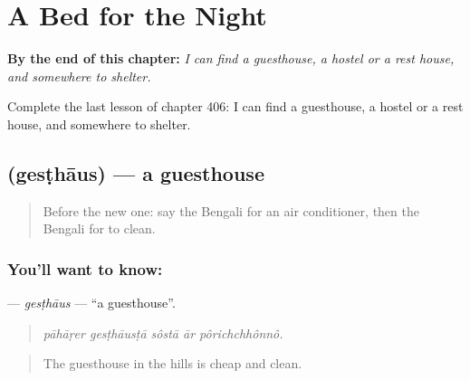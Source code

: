 
\chapter{A Bed for the Night}
\label{ch:bn-a-bed-for-the-night}

\begin{chapteropening}
\textbf{By the end of this chapter:} \emph{I can find a guesthouse, a hostel or a rest house, and somewhere to shelter.}

Complete the last lesson of chapter 406: I can find a guesthouse, a hostel or a rest house, and somewhere to shelter.
\end{chapteropening}

\section[\texorpdfstring{\bn{গেস্টহাউস} (gesṭhāus)}{গেস্টহাউস (gesṭhāus)}]{ (gesṭhāus) — a guesthouse}

\label{lesson:BN-C406-gesthaus}



\begin{quote}
Before the new one: say the Bengali for an air conditioner, then the Bengali for to clean.
\end{quote}

\subsection*{You'll want to know: }
\textbf{} — \emph{gesṭhāus} — \textquotedblleft{}a guesthouse\textquotedblright{}.

\begin{quote}
    
\end{quote}

\begin{quote}
\emph{pāhāṛer gesṭhāusṭā sôstā ār pôrichchhônnô.}
\end{quote}

\begin{quote}
The guesthouse in the hills is cheap and clean.
\end{quote}

